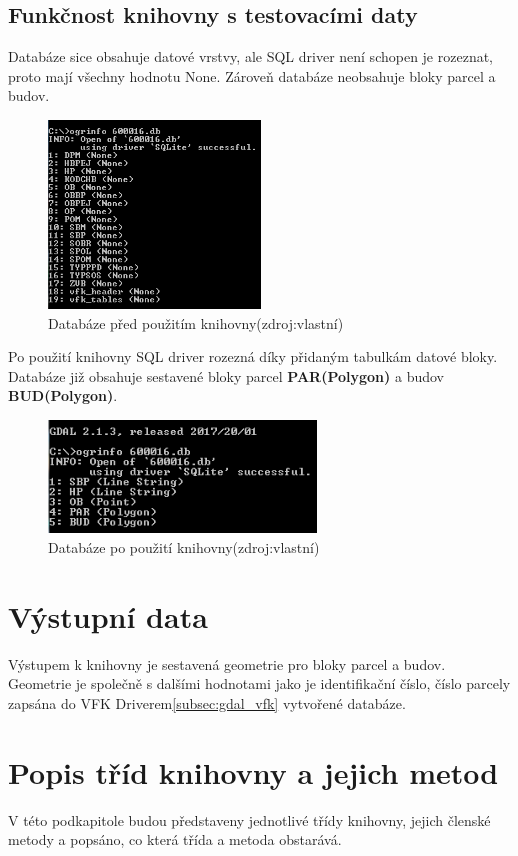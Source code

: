 \subsection{Funkčnost knihovny s testovacími daty}
Databáze sice obsahuje datové vrstvy, ale SQL driver není schopen je rozeznat, proto mají všechny hodnotu None. Zároveň databáze neobsahuje bloky parcel a budov.
\begin{figure}[H]
	 \centering
      \includegraphics[height=5cm]{./pictures/funkcnost_knihovny_pred.png}
      \caption{Databáze před použitím knihovny(zdroj:vlastní)}
      \label{fig:funkcnost_pred}
\end{figure}
Po použití knihovny SQL driver rozezná díky přidaným tabulkám datové bloky. Databáze již obsahuje sestavené bloky parcel \textbf{PAR(Polygon)} a budov \textbf{BUD(Polygon)}. 
\begin{figure}[H]
	 \centering
     \includegraphics[height=3cm]{./pictures/funkcnost_knihovny_po.png}
     \caption{Databáze po použití knihovny(zdroj:vlastní)}
     \label{fig:funkcnost_po}
\end{figure}  
  
\section{Výstupní data}
Výstupem k knihovny je sestavená geometrie pro bloky parcel a budov. Geometrie je společně s dalšími hodnotami jako je identifikační číslo, číslo parcely zapsána do VFK Driverem\ref{subsec:gdal_vfk} vytvořené databáze.

\section{Popis tříd knihovny a jejich metod}
V této podkapitole budou představeny jednotlivé třídy knihovny, jejich členské metody a popsáno, co která třída a metoda obstarává.

